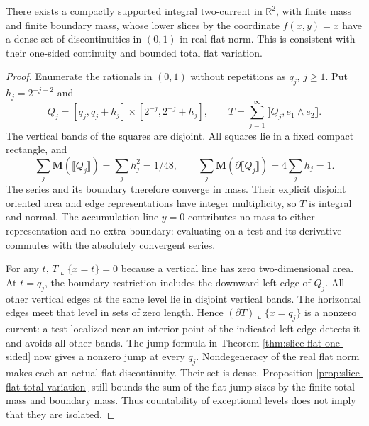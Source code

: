 \begin{example}\label{ex:dense-slice-jumps}
There exists a compactly supported integral two-current in $\mathbb R^2$, with finite mass and finite boundary mass, whose lower slices by the coordinate $f(x,y)=x$ have a dense set of discontinuities in $(0,1)$ in real flat norm. This is consistent with their one-sided continuity and bounded total flat variation.
\end{example}
\begin{proof}
Enumerate the rationals in $(0,1)$ without repetitions as $q_j$, $j\geq1$. Put $h_j=2^{-j-2}$ and
\[
 Q_j=[q_j,q_j+h_j]\times[2^{-j},2^{-j}+h_j],\qquad
 T=\sum_{j=1}^\infty\llbracket Q_j,e_1\wedge e_2\rrbracket.
\]
The vertical bands of the squares are disjoint. All squares lie in a fixed compact rectangle, and
\[
 \sum_j\mathbf M(\llbracket Q_j\rrbracket)=\sum_j h_j^2=1/48,
 \qquad
 \sum_j\mathbf M(\partial\llbracket Q_j\rrbracket)=4\sum_jh_j=1.
\]
The series and its boundary therefore converge in mass. Their explicit disjoint oriented area and edge representations have integer multiplicity, so $T$ is integral and normal. The accumulation line $y=0$ contributes no mass to either representation and no extra boundary: evaluating on a test and its derivative commutes with the absolutely convergent series.

For any $t$, $T\llcorner\{x=t\}=0$ because a vertical line has zero two-dimensional area. At $t=q_j$, the boundary restriction includes the downward left edge of $Q_j$. All other vertical edges at the same level lie in disjoint vertical bands. The horizontal edges meet that level in sets of zero length. Hence $(\partial T)\llcorner\{x=q_j\}$ is a nonzero current: a test localized near an interior point of the indicated left edge detects it and avoids all other bands. The jump formula in Theorem \ref{thm:slice-flat-one-sided} now gives a nonzero jump at every $q_j$. Nondegeneracy of the real flat norm makes each an actual flat discontinuity. Their set is dense. Proposition \ref{prop:slice-flat-total-variation} still bounds the sum of the flat jump sizes by the finite total mass and boundary mass. Thus countability of exceptional levels does not imply that they are isolated.
\end{proof}

